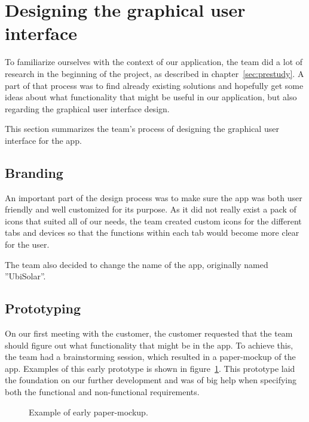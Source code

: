 \section{Designing the graphical user interface}
To familiarize ourselves with the context of our application, the team did a lot of research in the beginning of the project, as described in chapter~\ref{sec:prestudy}. A part of that process was to find already existing solutions and hopefully get some ideas about what functionality that might be useful in our application, but also regarding the graphical user interface design.

This section summarizes the team's process of designing the graphical user interface for the app.

\subsection{Branding}
An important part of the design process was to make sure the app was both user friendly and well customized for its purpose. As it did not really exist a pack of icons that suited all of our needs, the team created custom icons for the different tabs and devices so that the functions within each tab would become more clear for the user.

The team also decided to change the name of the app, originally named ''UbiSolar''.



\subsection{Prototyping}
On our first meeting with the customer, the customer requested that the team should figure out what functionality that might be in the app. To achieve this, the team had a brainstorming session, which resulted in a paper-mockup of the app. Examples of this early prototype is shown in figure~\ref{fig:designPaperProto}. This prototype laid the foundation on our further development and was of big help when specifying both the functional and non-functional requirements.

\begin{figure}[H]
  \centering
\quad
\caption{Example of early paper-mockup.}
\label{fig:designPaperProto}
\end{figure}

